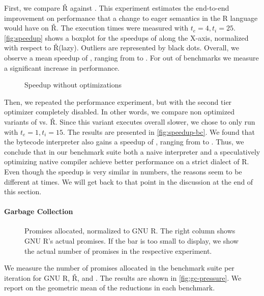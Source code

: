 \documentclass[review,creen,acmsmall]{acmart}
\renewcommand{\Rsh}{{\sf\v R}\xspace}
\begin{document}
First, we compare \Rsh against \rshstrict. This experiment estimates the
end-to-end improvement on performance that a change to eager semantics in the R
language would have on \Rsh. The execution times were measured with $t_e = 4,
t_i = 25$. \autoref{fig:speedup} shows a boxplot for the speedups of \rshstrict
along the X-axis, normalized with respect to \Rsh (lazy). Outliers are
represented by black dots. Overall, we observe a mean speedup of
\speedupRshStrict, ranging from \speedupRshStrictMin to \speedupRshStrictMax.
For \speedupRshStrictSignificant out of \benchmarkSuiteSize benchmarks we
measure a significant increase in performance.
%
\begin{figure}[h]
  \centering
  
  \caption{Speedup without optimizations}
  \label{fig:speedup-bc}
\end{figure}
%

Then, we repeated the performance experiment, but with the second tier optimizer
completely disabled. In other words, we compare non optimized variants of
\rshstrict vs. \Rsh. Since this variant executes overall \rshBCSlowdown slower,
we chose to only run with $t_e = 1, t_i = 15$. The results are presented in
\autoref{fig:speedup-bc}. We found that the bytecode interpreter also gains a
speedup of \speedupBCRshStrict, ranging from \speedupBCRshStrictMin to
\speedupBCRshStrictMax.
%
Thus, we conclude that in our benchmark suite both a naive interpreter and a
speculatively optimizing native compiler achieve better performance on a strict
dialect of R. Even though the speedup is very similar in numbers, the reasons
seem to be different at times. We will get back to that point in the discussion
at the end of this section.

\paragraph{Garbage Collection}

\begin{figure}[h]
  \centering
  
  \caption{Promises allocated, normalized to GNU R. The right column shows GNU R's actual promises. If the bar is too small to display, we show the actual number of promises in the respective experiment.}
  \label{fig:gc-pressure}
\end{figure}

We measure the number of promises allocated in the benchmark suite per iteration
for GNU R, \Rsh, and \rshstrict. The results are shown in
\autoref{fig:gc-pressure}. We report on the geometric mean of the reductions in
each benchmark.
\end{document}
